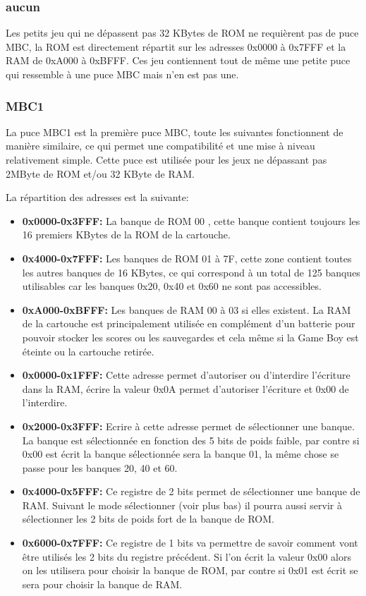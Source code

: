 \documentclass{report}
\begin{document}
\subsubsection{aucun}
	Les petits jeu qui ne dépassent pas 32 KBytes de ROM ne requièrent pas de puce MBC, la ROM est directement répartit sur les adresses 0x0000 à 0x7FFF et la RAM de 0xA000 à 0xBFFF. Ces jeu contiennent tout de même une petite puce qui ressemble à une puce MBC mais n'en est pas une.\\
\subsubsection{MBC1}
	La puce MBC1 est la première puce MBC, toute les suivantes fonctionnent de manière similaire, ce qui permet une compatibilité et une mise à niveau relativement simple. Cette puce est utilisée pour les jeux ne dépassant pas 2MByte de ROM et/ou 32 KByte de RAM.

La répartition des adresses est la suivante:\\
\begin{itemize}
\item \textbf{0x0000-0x3FFF:} La banque de ROM 00 , cette banque contient toujours les 16 premiers KBytes de la ROM de la cartouche.\\
\item \textbf{0x4000-0x7FFF:} Les banques de ROM 01 à 7F, cette zone contient toutes les autres banques de 16 KBytes, ce qui correspond à un total de 125 banques utilisables car les banques 0x20, 0x40 et 0x60 ne sont pas accessibles.\\
\item \textbf{0xA000-0xBFFF:} Les banques de RAM 00 à 03 si elles existent. La RAM de la cartouche est principalement utilisée en complément d'un batterie pour pouvoir stocker les scores ou les sauvegardes et cela même si la Game Boy est éteinte ou la cartouche retirée.\\
\item \textbf{0x0000-0x1FFF:} Cette adresse permet d'autoriser ou d'interdire l'écriture dans la RAM, écrire la valeur 0x0A permet d'autoriser l'écriture et 0x00 de l'interdire.\\
\item \textbf{0x2000-0x3FFF:} Ecrire à cette adresse permet de sélectionner une banque. La banque est sélectionnée en fonction des 5 bits de poids faible, par contre si 0x00 est écrit la banque sélectionnée sera la banque 01, la même chose se passe pour les banques 20, 40 et 60.\\
\item \textbf{0x4000-0x5FFF:} Ce registre de 2 bits permet de sélectionner une banque de RAM. Suivant le mode sélectionner (voir plus bas) il pourra aussi servir à sélectionner les 2 bits de poids fort de la banque de ROM.\\
\item \textbf{0x6000-0x7FFF:} Ce registre de 1 bits va permettre de savoir comment vont être utilisés les 2 bits du registre précédent. Si l'on écrit la valeur 0x00 alors on les utilisera pour choisir la banque de ROM, par contre si 0x01 est écrit se sera pour choisir la banque de RAM.\\
\end{itemize}
\end{document}
